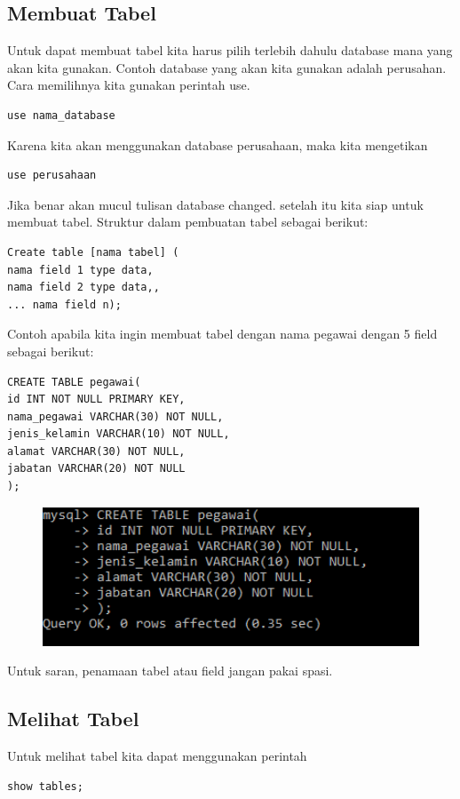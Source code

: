 \subsection{Membuat Tabel}
Untuk dapat membuat tabel kita harus pilih terlebih dahulu database mana yang akan kita gunakan. Contoh database yang akan kita gunakan adalah perusahan. Cara memilihnya kita gunakan perintah use.
\begin{lstlisting}
use nama_database
\end{lstlisting}
Karena kita akan menggunakan database perusahaan, maka kita mengetikan
\begin{lstlisting}
use perusahaan
\end{lstlisting}
Jika benar akan mucul tulisan database changed. setelah itu kita siap untuk membuat tabel. Struktur dalam pembuatan tabel sebagai berikut:
\begin{lstlisting}
Create table [nama tabel] (
nama field 1 type data,
nama field 2 type data,,
... nama field n);
\end{lstlisting}
Contoh apabila kita ingin membuat tabel dengan nama pegawai dengan 5 field sebagai berikut:
\begin{lstlisting}
CREATE TABLE pegawai(
id INT NOT NULL PRIMARY KEY,
nama_pegawai VARCHAR(30) NOT NULL,
jenis_kelamin VARCHAR(10) NOT NULL,
alamat VARCHAR(30) NOT NULL,
jabatan VARCHAR(20) NOT NULL
);
\end{lstlisting}
\begin{figure}[ht]
\centerline{\includegraphics[width=1\textwidth]
{figures/create_table}}
\caption{}
\label{create}
\end{figure}
Untuk saran, penamaan tabel atau field jangan pakai spasi.

\subsection{Melihat Tabel}
Untuk melihat tabel kita dapat menggunakan perintah
\begin{lstlisting}
show tables;
\end{lstlisting}

